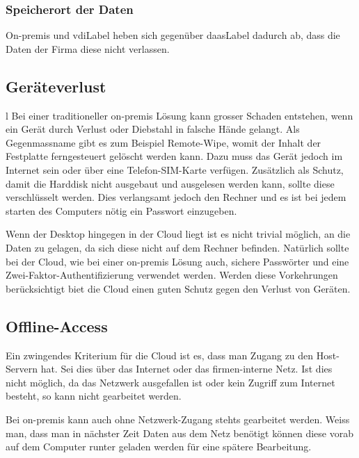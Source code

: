 \subsubsection{Speicherort der Daten}
On-premis und \Gls{vdiLabel} heben sich gegenüber \Gls{daasLabel} dadurch ab, dass die Daten der Firma diese nicht verlassen.

\subsection{Geräteverlust}l
Bei einer traditioneller on-premis Lösung kann grosser Schaden entstehen, wenn ein Gerät durch Verlust oder Diebstahl in falsche Hände gelangt.
Als Gegenmassname gibt es zum Beispiel Remote-Wipe, womit der Inhalt der Festplatte ferngesteuert gelöscht werden kann. Dazu muss das Gerät jedoch im Internet sein oder über eine Telefon-SIM-Karte verfügen.
Zusätzlich als Schutz, damit die Harddisk nicht ausgebaut und ausgelesen werden kann, sollte diese verschlüsselt werden. Dies verlangsamt jedoch den Rechner und es ist bei jedem starten des Computers nötig ein Passwort einzugeben.

Wenn der Desktop hingegen in der Cloud liegt ist es nicht trivial möglich, an die Daten zu gelagen, da sich diese nicht auf dem Rechner befinden.
Natürlich sollte bei der Cloud, wie bei einer on-premis Lösung auch, sichere Passwörter und eine Zwei-Faktor-Authentifizierung verwendet werden. Werden diese Vorkehrungen berücksichtigt biet die Cloud einen guten Schutz gegen den Verlust von Geräten.

\subsection{Offline-Access}
Ein zwingendes Kriterium für die Cloud ist es, dass man Zugang zu den Host-Servern hat. Sei dies über das Internet oder das firmen-interne Netz. Ist dies nicht möglich, da das Netzwerk ausgefallen ist oder kein Zugriff zum Internet besteht, so kann nicht gearbeitet werden.

Bei on-premis kann auch ohne Netzwerk-Zugang stehts gearbeitet werden. Weiss man, dass man in nächster Zeit Daten aus dem Netz benötigt können diese vorab auf dem Computer runter geladen werden für eine spätere Bearbeitung.

